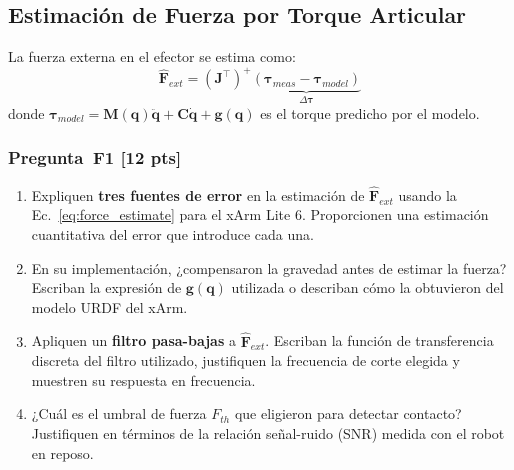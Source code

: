 \documentclass[journal,10pt,twoside]{IEEEtran}
\newcommand{\pts}[1]{\textbf{\color{tec_red}[#1 pts]}}
\begin{document}
\subsection{Estimación de Fuerza por Torque Articular}

La fuerza externa en el efector se estima como:
\begin{equation}
  \hat{\bm{F}}_{ext} = \left(\bm{J}^\top\right)^+
    \underbrace{\left(\bm{\tau}_{meas} - \bm{\tau}_{model}\right)}_{\Delta\bm{\tau}}
  \label{eq:force_estimate}
\end{equation}
donde $\bm{\tau}_{model} = \bm{M}(\bm{q})\ddot{\bm{q}} +
\bm{C}\dot{\bm{q}} + \bm{g}(\bm{q})$ es el torque predicho por el modelo.

\subsubsection*{Pregunta~F1 \pts{12}}
\begin{enumerate}[label=(\alph*)]
  \item Expliquen \textbf{tres fuentes de error} en la estimación de
        $\hat{\bm{F}}_{ext}$ usando la Ec.~\eqref{eq:force_estimate}
        para el xArm Lite 6. Proporcionen una estimación cuantitativa
        del error que introduce cada una.
  \item En su implementación, ¿compensaron la gravedad antes de estimar
        la fuerza? Escriban la expresión de $\bm{g}(\bm{q})$ utilizada
        o describan cómo la obtuvieron del modelo URDF del xArm.
  \item Apliquen un \textbf{filtro pasa-bajas} a $\hat{\bm{F}}_{ext}$.
        Escriban la función de transferencia discreta del filtro
        utilizado, justifiquen la frecuencia de corte elegida
        y muestren su respuesta en frecuencia.
  \item ¿Cuál es el umbral de fuerza $F_{th}$ que eligieron para
        detectar contacto? Justifiquen en términos de la relación
        señal-ruido (SNR) medida con el robot en reposo.
\end{enumerate}
\end{document}
